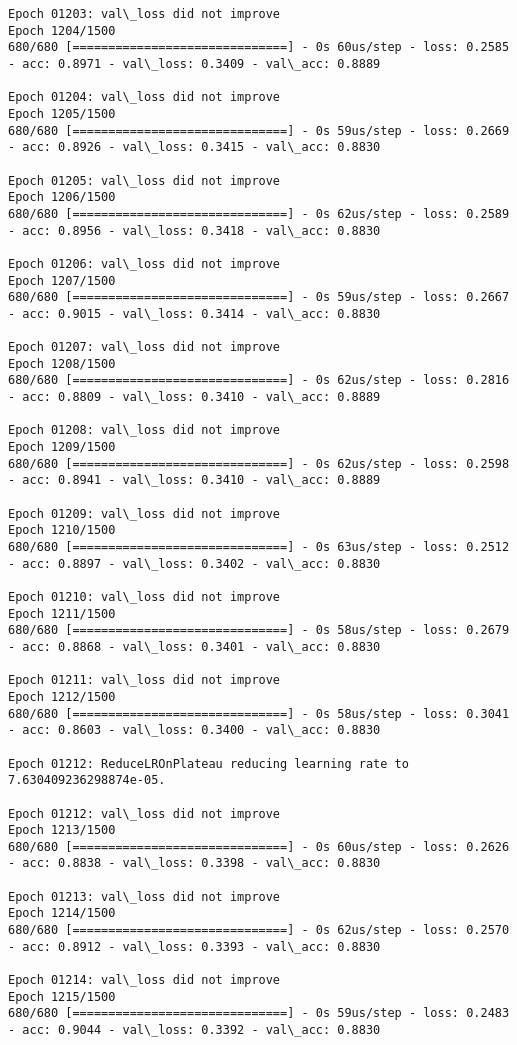 \documentclass[11pt]{article}
\begin{document}
\begin{Verbatim}[commandchars=\\\{\}]
Epoch 01203: val\_loss did not improve
Epoch 1204/1500
680/680 [==============================] - 0s 60us/step - loss: 0.2585 - acc: 0.8971 - val\_loss: 0.3409 - val\_acc: 0.8889

Epoch 01204: val\_loss did not improve
Epoch 1205/1500
680/680 [==============================] - 0s 59us/step - loss: 0.2669 - acc: 0.8926 - val\_loss: 0.3415 - val\_acc: 0.8830

Epoch 01205: val\_loss did not improve
Epoch 1206/1500
680/680 [==============================] - 0s 62us/step - loss: 0.2589 - acc: 0.8956 - val\_loss: 0.3418 - val\_acc: 0.8830

Epoch 01206: val\_loss did not improve
Epoch 1207/1500
680/680 [==============================] - 0s 59us/step - loss: 0.2667 - acc: 0.9015 - val\_loss: 0.3414 - val\_acc: 0.8830

Epoch 01207: val\_loss did not improve
Epoch 1208/1500
680/680 [==============================] - 0s 62us/step - loss: 0.2816 - acc: 0.8809 - val\_loss: 0.3410 - val\_acc: 0.8889

Epoch 01208: val\_loss did not improve
Epoch 1209/1500
680/680 [==============================] - 0s 62us/step - loss: 0.2598 - acc: 0.8941 - val\_loss: 0.3410 - val\_acc: 0.8889

Epoch 01209: val\_loss did not improve
Epoch 1210/1500
680/680 [==============================] - 0s 63us/step - loss: 0.2512 - acc: 0.8897 - val\_loss: 0.3402 - val\_acc: 0.8830

Epoch 01210: val\_loss did not improve
Epoch 1211/1500
680/680 [==============================] - 0s 58us/step - loss: 0.2679 - acc: 0.8868 - val\_loss: 0.3401 - val\_acc: 0.8830

Epoch 01211: val\_loss did not improve
Epoch 1212/1500
680/680 [==============================] - 0s 58us/step - loss: 0.3041 - acc: 0.8603 - val\_loss: 0.3400 - val\_acc: 0.8830

Epoch 01212: ReduceLROnPlateau reducing learning rate to 7.630409236298874e-05.

Epoch 01212: val\_loss did not improve
Epoch 1213/1500
680/680 [==============================] - 0s 60us/step - loss: 0.2626 - acc: 0.8838 - val\_loss: 0.3398 - val\_acc: 0.8830

Epoch 01213: val\_loss did not improve
Epoch 1214/1500
680/680 [==============================] - 0s 62us/step - loss: 0.2570 - acc: 0.8912 - val\_loss: 0.3393 - val\_acc: 0.8830

Epoch 01214: val\_loss did not improve
Epoch 1215/1500
680/680 [==============================] - 0s 59us/step - loss: 0.2483 - acc: 0.9044 - val\_loss: 0.3392 - val\_acc: 0.8830


\end{Verbatim}
\end{document}
